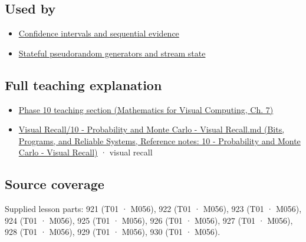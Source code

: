 \subsection{Used by}\label{appendix-a2360b435383-used-by}

\begin{itemize}
\tightlist
\item
  \hyperref[appendix-c83016554b1e]{Confidence intervals and sequential evidence}
\item
  \hyperref[appendix-e0f7c7e08f3a]{Stateful pseudorandom generators and stream state}
\end{itemize}

\subsection{Full teaching explanation}\label{appendix-a2360b435383-full-teaching-explanation}

\begin{itemize}
\tightlist
\item
  \href{../02-Mathematics-for-Visual-Computing/main.pdf\#nameddest=02-foundations-ii-ch023-discrete-and-continuous-distribution-families}{Phase 10 teaching section (Mathematics for Visual Computing, Ch. 7)}
\item
  \href{../01-Bits-Programs-and-Reliable-Systems/main.pdf\#nameddest=appendix-cb5af353ef77}{Visual Recall/10 - Probability and Monte Carlo - Visual Recall.md (Bits, Programs, and Reliable Systems, Reference notes: 10 - Probability and Monte Carlo - Visual Recall)} · visual recall
\end{itemize}

\subsection{Source coverage}\label{appendix-a2360b435383-source-coverage}

Supplied lesson parts: 921 (T01 · M056), 922 (T01 · M056), 923 (T01 · M056), 924 (T01 · M056), 925 (T01 · M056), 926 (T01 · M056), 927 (T01 · M056), 928 (T01 · M056), 929 (T01 · M056), 930 (T01 · M056).
